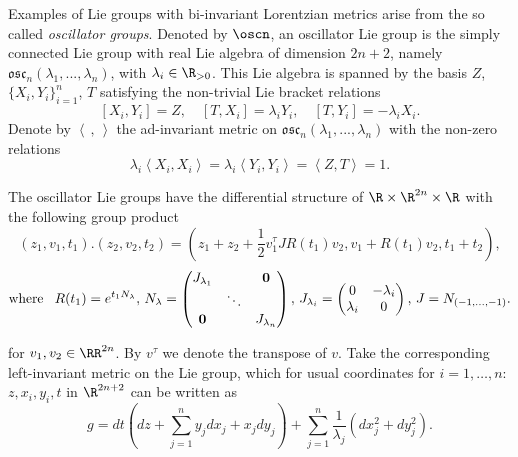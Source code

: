 \documentclass[11pt]{amsart}
\newcommand{\lela}{\left \langle}
\newcommand{\rira}{\right \rangle}
\theoremstyle{plain}
\theoremstyle{definition}
\theoremstyle{remark}
\begin{document}
			
	
	
	
	
	Examples of Lie groups with bi-invariant Lorentzian metrics arise from the so called  \textit{oscillator groups}. Denoted by $\oscn$, an oscillator Lie group is the simply connected Lie group with real Lie algebra of dimension $2n+2$, namely $\mathfrak{osc}_n(\lambda_1,...,\lambda_n)$, with $\lambda_i\in \R_{>0}$. This Lie algebra is  spanned by the basis $Z$,$\{X_i,Y_i\}_{i=1}^n$, $T$ satisfying the non-trivial Lie bracket relations
	\[ [X_i,Y_i]=Z, \quad [T, X_i]=\lambda_i Y_i, \quad  [T, Y_i]=- \lambda_i X_i.  \]
Denote by $\lela\,,\, \rira$  the ad-invariant  metric on $\mathfrak{osc}_n(\lambda_1,...,\lambda_n)$ with  the non-zero relations
	\[ \lambda_i \lela X_i,X_i \rira  = \lambda_i \lela Y_i,Y_i \rira = \lela Z,T  \rira  = 1.\]
	
	The oscillator Lie groups   have the differential structure of $\R \times \R^{2n} \times \R$ with the following group product
	\begin{equation*}
		(z_1,v_1,t_1) . (z_2,v_2,t_2)=(z_1+z_2+\frac{1}{2}v_1^{\tau}J R(t_1)v_2,v_1+R(t_1)v_2,t_1+t_2),
	\end{equation*}
	\[\text{where \,  } 
	R(t_1)= e^{t_1 N_{\lambda}}, \, N_\lambda=\left( \begin{matrix}
		J_{\lambda_1} &  & \mathbf{0} \\
		& \ddots & \\
		\mathbf{0} & & J_{\lambda_n}
	\end{matrix} \right),\, 
	J_{\lambda_i}=\left( \begin{matrix}
		0 & -\lambda_i \\
		\lambda_i & 0
	\end{matrix} \right), \, J = N_{(-1, \hdots, -1)}.
	\]
	
	for $v_1, v_2\in \RR^{2n}$. By $v^{\tau}$ we denote the transpose of $v$. 
	Take the corresponding left-invariant metric on the Lie group, which for usual  coordinates for $i=1, \hdots, n$: $z, x_i,y_i, t$ in $\R^{2n+2}$  can be written as
	\begin{equation}\label{metricosc}
		g=dt (dz +\sum_{j=1}^{n} y_j dx_j+ x_j dy_j) +\sum_{j=1}^{n}\frac1{\lambda_j}(dx_j^2+dy_j^2).
	\end{equation}
	
\end{document}
